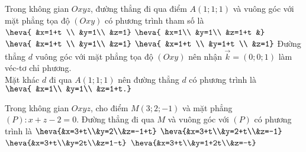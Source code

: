 \begin{ex}%
	Trong không gian $Oxyz$, đường thẳng đi qua điểm $A(1; 1; 1)$ và vuông góc với mặt phẳng tọa độ $(Oxy)$ có phương trình tham số là
	\choice
	{$\heva{	&x=1+t \\
			&y=1\\
			&z=1}$}
	{\True $\heva{	&x=1\\
			&y=1\\
			&z=1+t
			&}$}
	{$\heva{	&x=1+t \\
			&y=1\\
			&z=1}$}
	{$\heva{	&x=1+t \\
			&y=1+t \\
			&z=1}$}
	\loigiai
		{Đường thẳng $d$ vuông góc với mặt phẳng tọa độ $(Oxy)$ nên nhận $\overrightarrow{k}=(0; 0; 1)$ làm véc-tơ  chỉ phương.\\
		Mặt khác $d$ đi qua $A(1; 1; 1)$ nên đường thẳng $d$ có phương trình là $\heva{	&x=1\\
			&y=1\\
			&z=1+t.}$
		}
\end{ex}
\begin{ex}%
	Trong không gian $Oxyz$, cho điểm $M(3;2 ;-1)$ và mặt phẳng $(P)\colon x+z-2=0$. Đường thẳng đi qua $M$ và vuông góc với $(P)$ có phương trình là
	\choice
	{\True $\heva{&x=3+t\\&y=2\\&z=-1+t}$}
	{$\heva{&x=3+t\\&y=2+t\\&z=-1}$}
	{$\heva{&x=3+t\\&y=2t\\&z=1-t}$}
	{$\heva{&x=3+t\\&y=1+2t\\&z=-t}$}
\end{ex}
